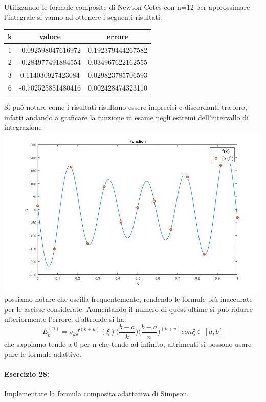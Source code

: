 \documentclass[12pt]{article}
\begin{document}
Utilizzando le formule composite di Newton-Cotes con n=12 per approssimare l'integrale si vanno ad ottenere i seguenti risultati: \\

\begin{center}
    \begin{tabular}{||c || c | c ||} 
        \hline
        k & valore & errore \\
        \hline
        \hline
        1 & -0.092598047616972 & 0.192379444267582 \\
        \hline
        2 & -0.284977491884554 & 0.034967622162555 \\
        \hline
        3 & 0.114030927423084 & 0.029823785706593 \\
        \hline
        6 & -0.702525851480416 & 0.002428474323110 \\
        \hline
        \hline
    \end{tabular}
    \end{center}
Si può notare come i risultati risultano essere imprecisi e discordanti tra loro, infatti andando a graficare la funzione in esame negli estremi dell'intervallo di integrazione \\
\includegraphics[width=\linewidth]{plot27.jpg}
possiamo notare che oscilla frequentemente, rendendo le formule più inaccurate per le ascisse considerate.
Aumentando il numero di quest'ultime si può ridurre ulteriormente l'errore, d'altronde si ha:
$$E_k^{(n)} = v_k f^{(k+u)}(\xi)\biggl(\frac{b-a}{k}\biggr)\biggl(\frac{b-a}{n}\biggr)^{(k+u)} con  \xi \in [a,b]$$
che sappiamo tende a 0 per n che tende ad infinito, altrimenti si possono usare pure le formule adattive.
\newpage
\paragraph{Esercizio 28:}
Implementare la formula composita adattativa di Simpson.
\end{document}
